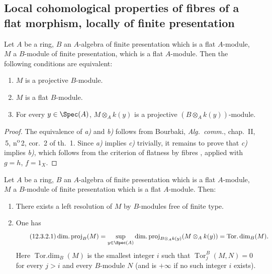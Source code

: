 \subsection{Local cohomological properties of fibres of a flat morphism, locally of finite presentation}
\label{subsection:IV.12.3}

\begin{lemma}[12.3.1]
\label{IV.12.3.1}
Let $A$ be a ring, $B$ an $A$-algebra of finite presentation which is a flat $A$-module, $M$ a $B$-module of finite presentation, which is a flat $A$-module.
Then the following conditions are equivalent:
\begin{enumerate}[label=\emph{\alph*)}]
  \item $M$ is a projective $B$-module.
  \item $M$ is a flat $B$-module.
  \item For every $y\in\Spec(A)$, $M\otimes_A k(y)$ is a projective $(B\otimes_A k(y))$-module.
\end{enumerate}
\end{lemma}

\begin{proof}

The equivalence of \emph{a)} and \emph{b)} follows from Bourbaki, \emph{Alg.\ comm.}, chap.~II, \textsection\,5, n\textsuperscript{o}\,2, cor.~2 of th.~1.
Since \emph{a)} implies \emph{c)} trivially, it remains to prove that \emph{c)} implies \emph{b)}, which follows from the criterion of flatness by fibres , applied with $g=h$, $f=1_X$.
\end{proof}

\begin{proposition}[12.3.2]
\label{IV.12.3.2}
Let $A$ be a ring, $B$ an $A$-algebra of finite presentation which is a flat $A$-module, $M$ a $B$-module of finite presentation which is a flat $A$-module.
Then:
\begin{enumerate}[label=(\roman*)]
  \item There exists a left resolution of $M$ by $B$-modules free of finite type.
  \item One has
  \begin{equation}
  \tag{12.3.2.1}
  \label{IV.12.3.2.1}
    \operatorname{dim.proj}_B(M)
    = \sup_{y\in\Spec(A)} \operatorname{dim.proj}_{B\otimes_A k(y)}(M\otimes_A k(y))
    = \operatorname{Tor.dim}_B(M).
  \end{equation}
  Here $\operatorname{Tor.dim}_B(M)$ is the smallest integer $i$ such that $\operatorname{Tor}_j^B(M,N)=0$ for every $j>i$ and every $B$-module $N$ (and is $+\infty$ if no such integer $i$ exists).
\end{enumerate}
\end{proposition}


